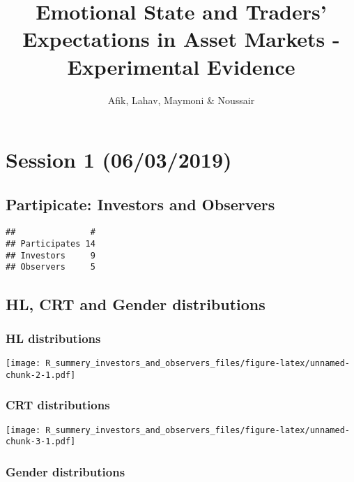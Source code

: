 \documentclass[]{article}
\title{Emotional State and Traders' Expectations in Asset Markets -
Experimental Evidence}
\author{Afik, Lahav, Maymoni \& Noussair}
\date{}
\begin{document}
\maketitle

{
\setcounter{tocdepth}{3}
\tableofcontents
}
\hypertarget{session-1-06032019}{%
\section{Session 1 (06/03/2019)}\label{session-1-06032019}}

\hypertarget{partipicate-investors-and-observers}{%
\subsection{Partipicate: Investors and
Observers}\label{partipicate-investors-and-observers}}

\begin{verbatim}
##               #
## Participates 14
## Investors     9
## Observers     5
\end{verbatim}

\hypertarget{hl-crt-and-gender-distributions}{%
\subsection{HL, CRT and Gender
distributions}\label{hl-crt-and-gender-distributions}}

\hypertarget{hl-distributions}{%
\subsubsection{HL distributions}\label{hl-distributions}}

\texttt{[image: R\_summery\_investors\_and\_observers\_files/figure-latex/unnamed-chunk-2-1.pdf]}

\hypertarget{crt-distributions}{%
\subsubsection{CRT distributions}\label{crt-distributions}}

\texttt{[image: R\_summery\_investors\_and\_observers\_files/figure-latex/unnamed-chunk-3-1.pdf]}

\hypertarget{gender-distributions}{%
\subsubsection{Gender distributions}\label{gender-distributions}}
\end{document}
